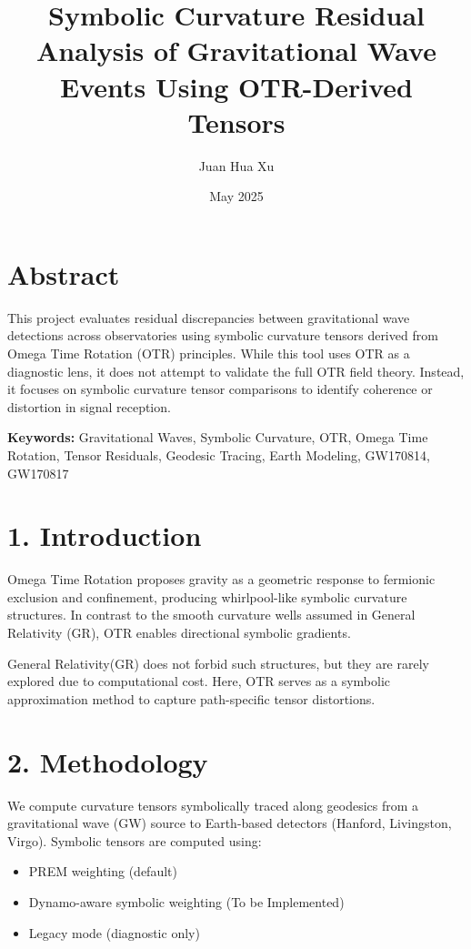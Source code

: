 \documentclass[11pt]{article}
\title{Symbolic Curvature Residual Analysis of Gravitational Wave Events Using OTR-Derived Tensors}
\author{Juan Hua Xu}
\affil[1]{Independent Researcher, Fairfax, VA, USA\\

\texttt{\href{github.com/JuanHuaXu}{github.com/JuanHuaXu}}}
\date{May 2025}
\begin{document}
	
	\maketitle
	
	\section*{Abstract}
	This project evaluates residual discrepancies between gravitational wave detections across observatories using symbolic curvature tensors derived from Omega Time Rotation (OTR) principles. While this tool uses OTR as a diagnostic lens, it does not attempt to validate the full OTR field theory. Instead, it focuses on symbolic curvature tensor comparisons to identify coherence or distortion in signal reception.
	
	\vspace{0.5em}
	\noindent\textbf{Keywords:} Gravitational Waves, Symbolic Curvature, OTR, Omega Time Rotation, Tensor Residuals, Geodesic Tracing, Earth Modeling, GW170814, GW170817
	
	\section*{1. Introduction}
	Omega Time Rotation proposes gravity as a geometric response to fermionic exclusion and confinement, producing whirlpool-like symbolic curvature structures. In contrast to the smooth curvature wells assumed in General Relativity (GR), OTR enables directional symbolic gradients.
	
	General Relativity(GR) does not forbid such structures, but they are rarely explored due to computational cost. Here, OTR serves as a symbolic approximation method to capture path-specific tensor distortions.
	
	\section*{2. Methodology}
	We compute curvature tensors symbolically traced along geodesics from a gravitational wave (GW) source to Earth-based detectors (Hanford, Livingston, Virgo). Symbolic tensors are computed using:
	
	\begin{itemize}
		\item PREM weighting (default)
		\item Dynamo-aware symbolic weighting (To be Implemented)
		\item Legacy mode (diagnostic only)
	\end{itemize}
	
\end{document}
